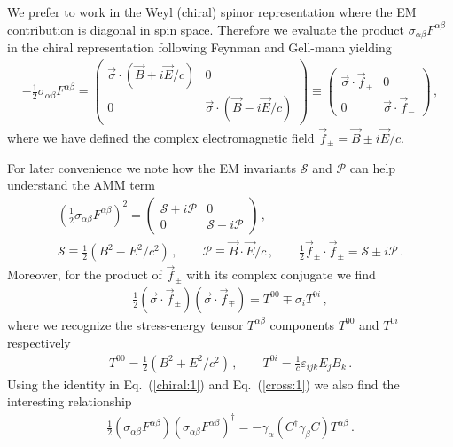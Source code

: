 \documentclass[addchapnum]{ws-rv961x669} %
\newcommand{\req}[1]{Eq.~(\ref{#1})}
\begin{document}
We prefer to work in the Weyl (chiral) spinor representation where the EM contribution is diagonal in spin space. Therefore we evaluate the product $\sigma_{\alpha\beta}F^{\alpha\beta}$ in the chiral representation following Feynman and Gell-mann\cite{Feynman:1958ty} yielding
\begin{align}
    \label{chiral:1}
    -\frac{1}{2}\sigma_{\alpha\beta}F^{\alpha\beta}=
    \begin{pmatrix}
        \vec{\sigma}\cdot(\vec{B}+i\vec{E}/c) & 0\\
        0 & \vec{\sigma}\cdot(\vec{B}-i\vec{E}/c)
    \end{pmatrix}\equiv
    \begin{pmatrix}
        \vec{\sigma}\cdot\vec{f}_{+} & 0 \\
        0 & \vec{\sigma}\cdot\vec{f}_{-}
    \end{pmatrix}\,,
\end{align}
where we have defined the complex electromagnetic field $\vec{f}_{\pm}=\vec{B}\pm i\vec{E}/c$.

For later convenience we note how the EM invariants $\mathcal{S}$ and $\mathcal{P}$ can help understand the AMM term 
\begin{gather}
    \left(\frac{1}{2}\sigma_{\alpha\beta}F^{\alpha\beta}\right)^{2}=
    \begin{pmatrix}
        \mathcal{S}+i\mathcal{P} & 0\\
        0 & \mathcal{S}-i\mathcal{P}
    \end{pmatrix}\,,\\
    \mathcal{S}\equiv\frac{1}{2}\left(B^{2}-E^{2}/c^{2}\right)\,,\qquad
    \mathcal{P}\equiv\vec{B}\cdot\vec{E}/c\,,\qquad
    \frac{1}{2}\vec{f}_{\pm}\cdot\vec{f}_{\pm}=\mathcal{S}\pm i\mathcal{P}\,.
\end{gather}
Moreover, for the product of $\vec{f}_{\pm}$ with its complex conjugate we find
\begin{align}
        \label{cross:1}
        \frac{1}{2}\left(\vec{\sigma}\cdot\vec{f}_{\pm}\right)\left(\vec{\sigma}\cdot\vec{f}_{\mp}\right)=T^{00}\mp \sigma_{i}T^{0i}\,,
\end{align}
where we recognize the  stress-energy tensor $T^{\alpha\beta}$ components $T^{00}$ and $T^{0i}$ respectively
\begin{align}
    T^{00}=\frac{1}{2}\left(B^{2}+E^{2}/c^{2}\right)\,,\qquad
    T^{0i}=\frac{1}{c}\varepsilon_{ijk}E_{j}B_{k}\,.
\end{align}
Using the identity in \req{chiral:1} and \req{cross:1} we also find the interesting relationship
\begin{align}
    \label{cross:2}
    \frac{1}{2}\left(\sigma_{\alpha\beta}F^{\alpha\beta}\right)\left(\sigma_{\alpha\beta}F^{\alpha\beta}\right)^{\dag}=
    -\gamma_{\alpha}\left(C^{\dag}\gamma_{\beta}C\right)T^{\alpha\beta}\,.
\end{align}
\end{document}
